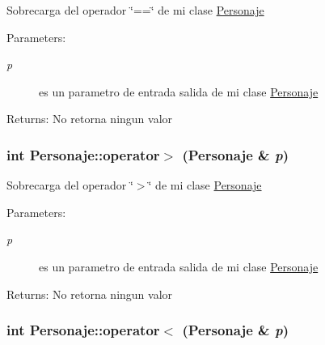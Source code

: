 Sobrecarga del operador \char`\"{}==\char`\"{} de mi clase \hyperlink{classPersonaje}{Personaje} \begin{Desc}
\item[Parameters:]
\begin{description}
\item[{\em p}]es un parametro de entrada salida de mi clase \hyperlink{classPersonaje}{Personaje} \end{description}
\end{Desc}
\begin{Desc}
\item[Returns:]No retorna ningun valor \end{Desc}
\hypertarget{classPersonaje_7717f9a6ad3d7b68a5c953930510f575}{
\subsubsection[operator$>$]{\setlength{\rightskip}{0pt plus 5cm}int Personaje::operator$>$ ({\bf Personaje} \& {\em p})}}
\label{classPersonaje_7717f9a6ad3d7b68a5c953930510f575}


Sobrecarga del operador \char`\"{}$>$\char`\"{} de mi clase \hyperlink{classPersonaje}{Personaje} \begin{Desc}
\item[Parameters:]
\begin{description}
\item[{\em p}]es un parametro de entrada salida de mi clase \hyperlink{classPersonaje}{Personaje} \end{description}
\end{Desc}
\begin{Desc}
\item[Returns:]No retorna ningun valor \end{Desc}
\hypertarget{classPersonaje_e55182c2fd21118b27c5e911f800c1d6}{
\subsubsection[operator$<$]{\setlength{\rightskip}{0pt plus 5cm}int Personaje::operator$<$ ({\bf Personaje} \& {\em p})}}
\label{classPersonaje_e55182c2fd21118b27c5e911f800c1d6}


